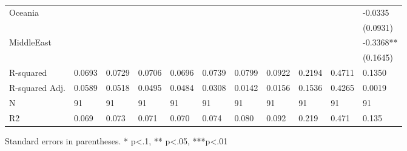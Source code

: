 \begin{table}
\begin{center}
\begin{tabular}{lllllllllll}
Oceania        &            &            &          &           &          &          &          &            &            & -0.0335    \\
               &            &            &          &           &          &          &          &            &            & (0.0931)   \\
MiddleEast     &            &            &          &           &          &          &          &            &            & -0.3368**  \\
               &            &            &          &           &          &          &          &            &            & (0.1645)   \\
R-squared      & 0.0693     & 0.0729     & 0.0706   & 0.0696    & 0.0739   & 0.0799   & 0.0922   & 0.2194     & 0.4711     & 0.1350     \\
R-squared Adj. & 0.0589     & 0.0518     & 0.0495   & 0.0484    & 0.0308   & 0.0142   & 0.0156   & 0.1536     & 0.4265     & 0.0019     \\
N              & 91         & 91         & 91       & 91        & 91       & 91       & 91       & 91         & 91         & 91         \\
R2             & 0.069      & 0.073      & 0.071    & 0.070     & 0.074    & 0.080    & 0.092    & 0.219      & 0.471      & 0.135      \\
\hline
\end{tabular}
\end{center}
\end{table}
\bigskip
Standard errors in parentheses. \newline 
* p<.1, ** p<.05, ***p<.01